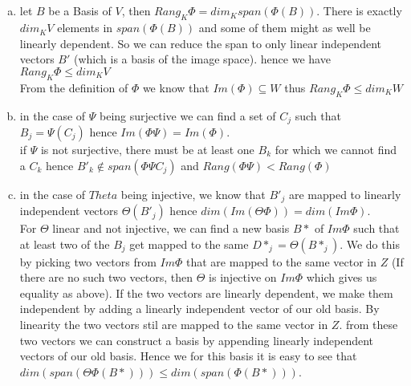 \documentclass[a4paper,10pt]{article}
\begin{document}
\subsection{}
\label{sec:two}
\begin{enumerate}[(a)]
	\item let $B$ be a  Basis of $V$, then  $Rang_K \Phi= dim_K span(\Phi(B))$. There is exactly $dim_K V$ elements in $ span (\Phi(B))$ and some of them might as well be linearly dependent. So we can reduce the span to only linear independent vectors $B'$ (which is a basis of the image space). hence we have $Rang_K\Phi\leq dim_K V$\\
		From the definition of $\Phi$ we know that $Im (\Phi) \subseteq W$ thus $Rang_K \Phi \leq dim_K W$
	\item in the case of $ \Psi$ being surjective we can find a set of $C_j$ such that $B_j=\Psi(C_j)$ hence $Im( \Phi\Psi)=Im (\Phi)$.\\
		if $\Psi $ is not surjective, there must be at least one  $B_k$ for which we cannot find a $C_k$ hence
		$B'_k \notin span(\Phi\Psi C_j)$ and $Rang (\Phi\Psi) < Rang (\Phi)$
	\item in the case of $Theta$ being injective, we know that $B'_j$ are mapped to linearly independent vectors $ \Theta(B'_j)$ hence $ dim (Im(\Theta\Phi))=dim(Im\Phi)$.\\
		For $\Theta$ linear and not injective, we can find a new basis $B*$ of $Im \Phi$ such that at least two of the $B_j$ get mapped to the same $D*_j=\Theta(B*_j)$. We do this by picking two vectors from $Im \Phi$ that are mapped to the same vector in $Z$ (If there are no such two vectors, then $\Theta$ is injective on $Im \Phi$ which gives us equality as above).
		If the two vectors are linearly dependent, we make them independent by adding a linearly independent vector of our old basis. By linearity the two vectors stil are mapped to the same vector in $Z$.
		from these two vectors we can construct a basis by appending linearly independent vectors of our old basis.
		Hence we for this basis it is easy to see that $dim (span(\Theta\Phi(B*))) \leq dim(span(\Phi(B*)))$.

\end{enumerate}
\subsection{}
\label{sec:three}
\end{document}
